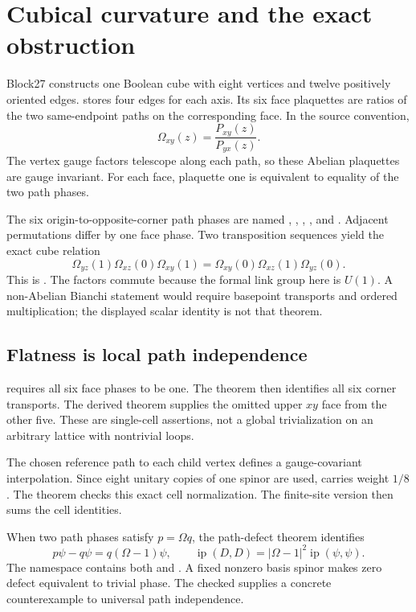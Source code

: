 \section{Cubical curvature and the exact obstruction}

Block27 constructs one Boolean cube with eight vertices and twelve positively oriented edges.  stores four edges for each axis. Its six face plaquettes are ratios of the two same-endpoint paths on the corresponding face. In the source convention,
\[
 \Omega_{xy}(z)=\frac{P_{xy}(z)}{P_{yx}(z)}.
\]
The vertex gauge factors telescope along each path, so these Abelian plaquettes are gauge invariant. For each face, plaquette one is equivalent to equality of the two path phases.

The six origin-to-opposite-corner path phases are named , , , ,  and . Adjacent permutations differ by one face phase. Two transposition sequences yield the exact cube relation
\[
 \Omega_{yz}(1)\Omega_{xz}(0)\Omega_{xy}(1)
 =\Omega_{xy}(0)\Omega_{xz}(1)\Omega_{yz}(0).
\]
This is . The factors commute because the formal link group here is \(U(1)\). A non-Abelian Bianchi statement would require basepoint transports and ordered multiplication; the displayed scalar identity is not that theorem.

\subsection{Flatness is local path independence}

 requires all six face phases to be one. The theorem  then identifies all six corner transports. The derived theorem  supplies the omitted upper \(xy\) face from the other five. These are single-cell assertions, not a global trivialization on an arbitrary lattice with nontrivial loops.

The chosen reference path to each child vertex defines a gauge-covariant interpolation. Since eight unitary copies of one spinor are used,  carries weight \(1/8\). The theorem  checks this exact cell normalization. The finite-site version  then sums the cell identities.

When two path phases satisfy \(p=\Omega q\), the path-defect theorem identifies
\[
 p\psi-q\psi=q(\Omega-1)\psi,
 \qquad
 \operatorname{ip}(D,D)=|\Omega-1|^2\operatorname{ip}(\psi,\psi).
\]
The namespace  contains both  and . A fixed nonzero basis spinor makes zero defect equivalent to trivial phase. The checked  supplies a concrete counterexample to universal path independence.

